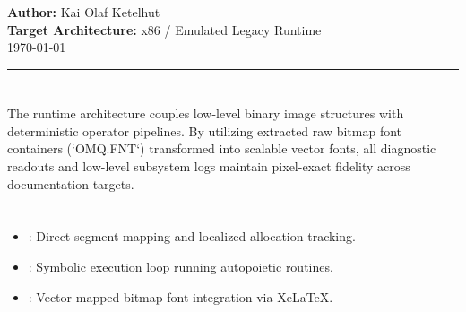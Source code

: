 \documentclass{article}
\begin{document}
\begin{center}
    {\Huge {}} \\[1em]
    {\Large {}} \\[2em]
    \textbf{Author:} Kai Olaf Ketelhut \\
    \textbf{Target Architecture:} x86 / Emulated Legacy Runtime \\
    \today
\end{center}

\hrule
\vspace{1.5em}

\section*{}
The  runtime architecture couples low-level binary image structures with deterministic operator pipelines. By utilizing extracted raw bitmap font containers (`OMQ.FNT`) transformed into scalable vector fonts, all diagnostic readouts and low-level subsystem logs maintain pixel-exact fidelity across documentation targets.

\section*{}
\begin{itemize}
    \item {}: Direct segment mapping and localized allocation tracking.
    \item {}: Symbolic execution loop running autopoietic routines.
    \item {}: Vector-mapped bitmap font integration via XeLaTeX.
\end{itemize}
\end{document}
